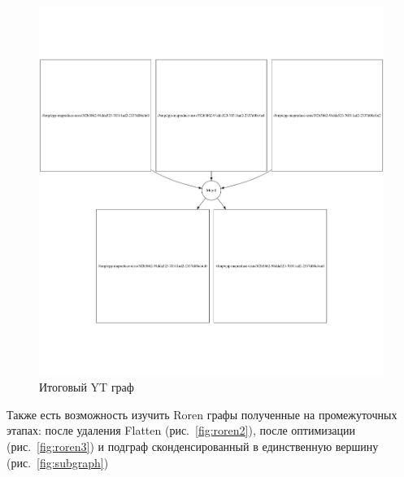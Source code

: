 \begin{figure}[h]
    \centering
    \includegraphics[width=\textwidth]{img/ytgraph.png}
    \caption{Итоговый YT граф}
    \label{fig:ytgraph}
\end{figure}

Также есть возможность изучить Roren графы полученные на промежуточных этапах: после удаления Flatten (рис.~\ref{fig:roren2}), после оптимизации (рис.~\ref{fig:roren3}) и подграф сконденсированный в единственную вершину (рис.~\ref{fig:subgraph})

